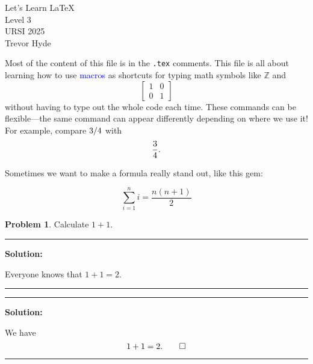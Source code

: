 \documentclass[11pt]{article}
\theoremstyle{definition}
\def\ZZ{\mathbb{Z}}
\newcommand{\blue}[1]{\textcolor{blue}{#1}}
\newcommand{\mat}[4]{
    \begin{bmatrix}
        #1 & #2\\
        #3 & #4
    \end{bmatrix}
}
\newcommand{\myfrac}[2]{%
  \mathchoice
    {\frac{#1}{#2}}     %
    {#1/#2}             %
    {#1/#2}             %
    {#1/#2}             %
}
\newcommand{\head}[1]{
	\begin{center}         
		{\large #1}        
	\end{center}
	\bigskip               
}
\newenvironment{formula}
{%
  \begin{tcolorbox}[
    colback=black,      %
    coltext=white,      %
    boxsep=1mm,         %
    boxrule=0pt,        %
    center,             %
  ]
    \[
}
{%
    \]
    \end{tcolorbox}
}
\theoremstyle{bluestyle}
\newtheorem{problem}{Problem}[section]
\newenvironment{solution}
{%
    \vspace{0.5em}%
    \hrule%
    \vspace{0.2em}%

    \noindent\textbf{Solution:}\!\!\!\!\!
    \pushQED{\qed}
}
{%
    \popQED
    \vspace{.2em}
    \hrule%
    \vspace{0.75em}%
}
\begin{document}
 

\head{Let's Learn \LaTeX\\
Level 3\\
URSI 2025\\
Trevor Hyde
}

Most of the content of this file is in the \texttt{.tex} comments.
This file is all about learning how to use \blue{macros} as shortcuts for typing math symbols like $\ZZ$ and 
\[
    \mat 1 0 0 1
\]
without having to type out the whole code each time.
These commands can be flexible---the same command can appear differently depending on where we use it!
For example, compare $\myfrac{3}{4}$ with
\[
    \myfrac{3}{4}.
\]

Sometimes we want to make a formula really stand out, like this gem:

\begin{formula}
    \sum_{i=1}^n{i} = \frac{n(n+1)}{2}
\end{formula}


\begin{problem}
    Calculate $1 + 1$.
\end{problem}

\begin{solution}
    Everyone knows that $1 + 1 = 2$.
\end{solution}

\begin{solution}
    We have
    \[
        1 + 1 = 2.\qedhere
    \]
\end{solution}
\end{document}
